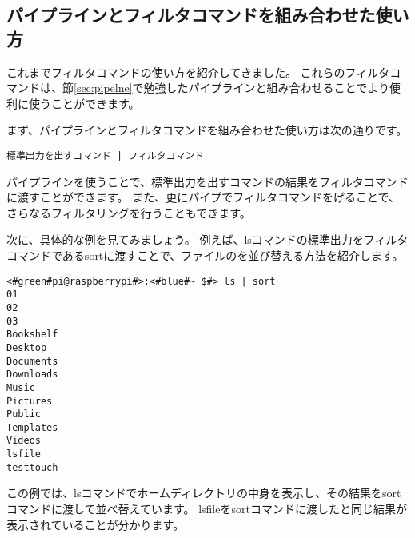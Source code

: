 \subsection{パイプラインとフィルタコマンドを組み合わせた使い方}
これまでフィルタコマンドの使い方を紹介してきました。
これらのフィルタコマンドは、節\ref{sec:pipelne}で勉強したパイプラインと組み合わせることでより便利に使うことができます。

まず、パイプラインとフィルタコマンドを組み合わせた使い方は次の通りです。

\begin{lstlisting}[caption=パイプラインを用いたフィルタコマンドの実行例, label=pipeline_filter]
標準出力を出すコマンド | フィルタコマンド
\end{lstlisting}

パイプラインを使うことで、標準出力を出すコマンドの結果をフィルタコマンドに渡すことができます。
また、更にパイプでフィルタコマンドをげることで、さらなるフィルタリングを行うこともできます。

次に、具体的な例を見てみましょう。
例えば、lsコマンドの標準出力をフィルタコマンドであるsortに渡すことで、ファイルのを並び替える方法を紹介します。

\begin{lstlisting}[caption=パイプラインを用いたsortコマンドの実行例, label=sort_example]
<#green#pi@raspberrypi#>:<#blue#~ $#> ls | sort
01
02
03
Bookshelf
Desktop
Documents
Downloads
Music
Pictures
Public
Templates
Videos
lsfile
testtouch
\end{lstlisting}

この例では、lsコマンドでホームディレクトリの中身を表示し、その結果をsortコマンドに渡して並べ替えています。
lsfileをsortコマンドに渡したと同じ結果が表示されていることが分かります。


